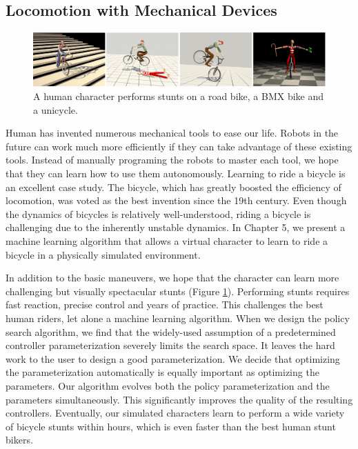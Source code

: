 \subsection{Locomotion with Mechanical Devices}

\begin{figure}[!h]
  \centering
    \includegraphics[width=\textwidth]{figures/teaserBicycle.eps}
  \caption{A human character performs stunts on a road bike, a BMX bike and a unicycle.}
  \label{fig:teaser3}
\end{figure}

Human has invented numerous mechanical tools to ease our life. Robots in the future can work much more efficiently if they can take advantage of these existing tools. Instead of manually programing the robots to master each tool, we hope that they can learn how to use them autonomously. Learning to ride a bicycle is an excellent case study. The bicycle, which has greatly boosted the efficiency of locomotion, was voted as the best invention since the 19th century. Even though the dynamics of bicycles is relatively well-understood, riding a bicycle is challenging due to the inherently unstable dynamics. In Chapter 5, we present a machine learning algorithm \cite{Tan:2014} that allows a virtual character to learn to ride a bicycle in a physically simulated environment. 

In addition to the basic maneuvers, we hope that the character can learn more challenging but visually spectacular stunts (Figure \ref{fig:teaser3}). Performing stunts requires fast reaction, precise control and years of practice. This challenges the best human riders, let alone a machine learning algorithm. When we design the policy search algorithm, we find that the widely-used assumption of a predetermined controller parameterization severely limits the search space. It leaves the hard work to the user to design a good parameterization. We decide that optimizing the parameterization automatically is equally important as optimizing the parameters. Our algorithm evolves both the policy parameterization and the parameters simultaneously. This significantly improves the quality of the resulting controllers. Eventually, our simulated characters learn to perform a wide variety of bicycle stunts within hours, which is even faster than the best human stunt bikers.

